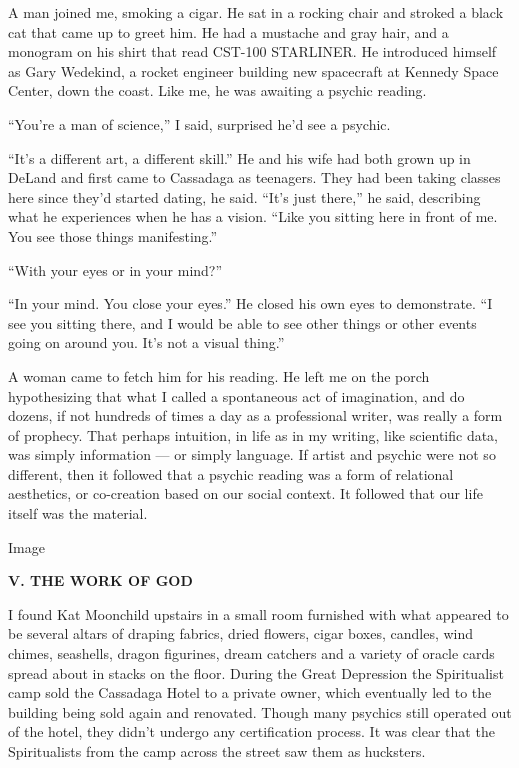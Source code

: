 A man joined me, smoking a cigar. He sat in a rocking chair and stroked
a black cat that came up to greet him. He had a mustache and gray hair,
and a monogram on his shirt that read CST-100 STARLINER. He introduced
himself as Gary Wedekind, a rocket engineer building new spacecraft at
Kennedy Space Center, down the coast. Like me, he was awaiting a psychic
reading.

``You're a man of science,'' I said, surprised he'd see a psychic.

``It's a different art, a different skill.'' He and his wife had both
grown up in DeLand and first came to Cassadaga as teenagers. They had
been taking classes here since they'd started dating, he said. ``It's
just there,'' he said, describing what he experiences when he has a
vision. ``Like you sitting here in front of me. You see those things
manifesting.''

``With your eyes or in your mind?''

``In your mind. You close your eyes.'' He closed his own eyes to
demonstrate. ``I see you sitting there, and I would be able to see other
things or other events going on around you. It's not a visual thing.''

A woman came to fetch him for his reading. He left me on the porch
hypothesizing that what I called a spontaneous act of imagination, and
do dozens, if not hundreds of times a day as a professional writer, was
really a form of prophecy. That perhaps intuition, in life as in my
writing, like scientific data, was simply information --- or simply
language. If artist and psychic were not so different, then it followed
that a psychic reading was a form of relational aesthetics, or
co-creation based on our social context. It followed that our life
itself was the material.

Image

\textbf{V. THE WORK OF GOD}

I found Kat Moonchild upstairs in a small room furnished with what
appeared to be several altars of draping fabrics, dried flowers, cigar
boxes, candles, wind chimes, seashells, dragon figurines, dream catchers
and a variety of oracle cards spread about in stacks on the floor.
During the Great Depression the Spiritualist camp sold the Cassadaga
Hotel to a private owner, which eventually led to the building being
sold again and renovated. Though many psychics still operated out of the
hotel, they didn't undergo any certification process. It was clear that
the Spiritualists from the camp across the street saw them as hucksters.

